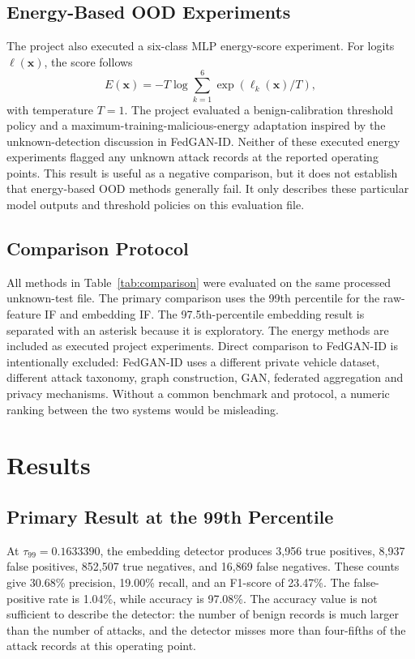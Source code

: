 \documentclass[journal]{IEEEtran}
\begin{document}
\subsection{Energy-Based OOD Experiments}
The project also executed a six-class MLP energy-score experiment. For logits $\boldsymbol{\ell}(\mathbf{x})$, the score follows
\begin{equation}
 E(\mathbf{x})=-T\log\sum_{k=1}^{6}\exp(\ell_k(\mathbf{x})/T),
 \label{eq:energy}
\end{equation}
with temperature $T=1$. The project evaluated a benign-calibration threshold policy and a maximum-training-malicious-energy adaptation inspired by the unknown-detection discussion in FedGAN-ID. Neither of these executed energy experiments flagged any unknown attack records at the reported operating points. This result is useful as a negative comparison, but it does not establish that energy-based OOD methods generally fail. It only describes these particular model outputs and threshold policies on this evaluation file.

\subsection{Comparison Protocol}
All methods in Table~\ref{tab:comparison} were evaluated on the same processed unknown-test file. The primary comparison uses the 99th percentile for the raw-feature IF and embedding IF. The 97.5th-percentile embedding result is separated with an asterisk because it is exploratory. The energy methods are included as executed project experiments. Direct comparison to FedGAN-ID is intentionally excluded: FedGAN-ID uses a different private vehicle dataset, different attack taxonomy, graph construction, GAN, federated aggregation and privacy mechanisms. Without a common benchmark and protocol, a numeric ranking between the two systems would be misleading.

\section{Results}
\subsection{Primary Result at the 99th Percentile}
At $\tau_{99}=0.1633390$, the embedding detector produces 3,956 true positives, 8,937 false positives, 852,507 true negatives, and 16,869 false negatives. These counts give 30.68\% precision, 19.00\% recall, and an F1-score of 23.47\%. The false-positive rate is 1.04\%, while accuracy is 97.08\%. The accuracy value is not sufficient to describe the detector: the number of benign records is much larger than the number of attacks, and the detector misses more than four-fifths of the attack records at this operating point.
\end{document}
